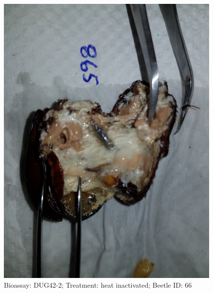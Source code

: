 \documentclass[11pt]{scrartcl}
\begin{document}
\begin{figure}[h!]
    \centering
    \includegraphics[width=\linewidth, height=\textheight, keepaspectratio]{uploads/btl.pm_image.a8e1877f76b4c77d.4475673432203836355f5265702d3220284849292e6a7067.jpg}
    \caption{Bioassay: DUG42-2; Treatment: heat inactivated; Beetle ID: 66}
\end{figure}
\clearpage
\end{document}
